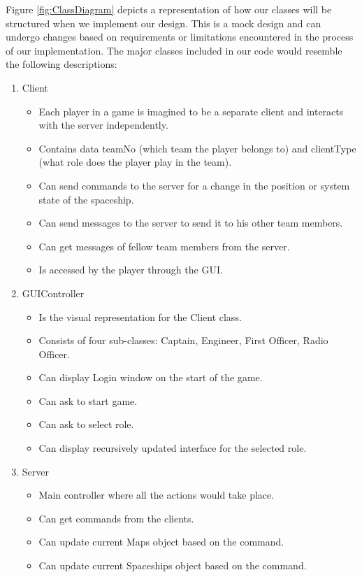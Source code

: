 
Figure \ref{fig:ClassDiagram} depicts a representation of how our classes will be structured when we implement our design. This is a mock design and can undergo changes based on requirements or limitations encountered in the process of our implementation. The major classes included in our code would resemble the following descriptions: 

\begin{enumerate}
\item Client
\begin{itemize}
\item Each player in a game is imagined to be a separate client and interacts with the server independently.
\item Contains data teamNo (which team the player belongs to) and clientType (what role does the player play in the team).
\item Can send commands to the server for a change in the position or system state of the spaceship.
\item Can send messages to the server to send it to his other team members.
\item Can get messages of fellow team members from the server.
\item Is accessed by the player through the GUI.
\end{itemize}
\item GUIController
\begin{itemize}
\item Is the visual representation for the Client class.
\item Consists of four sub-classes: Captain, Engineer, First Officer, Radio Officer.
\item Can display Login window on the start of the game.
\item Can ask to start game.
\item Can ask to select role.
\item Can display recursively updated interface for the selected role.
\end{itemize}
\item Server
\begin{itemize}
\item Main controller where all the actions would take place.
\item Can get commands from the clients.
\item Can update current Maps object based on the command.
\item Can update current Spaceships object based on the command.

\end{itemize}
\end{enumerate}
